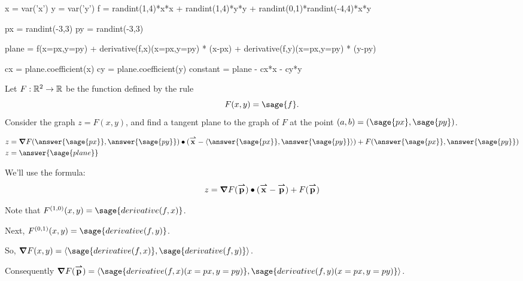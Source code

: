 \documentclass{ximera}
\author{Jim Fowler \and Bart Snapp}
\begin{document}
\makerandom

\begin{sagesilent}
x = var('x')
y = var('y')
f = randint(1,4)*x*x + randint(1,4)*y*y + randint(0,1)*randint(-4,4)*x*y

px = randint(-3,3)
py = randint(-3,3)

plane = f(x=px,y=py) + derivative(f,x)(x=px,y=py) * (x-px) +   derivative(f,y)(x=px,y=py) * (y-py)

cx = plane.coefficient(x)
cy = plane.coefficient(y)
constant = plane - cx*x - cy*y
  
\end{sagesilent}

\begin{exercise}

  Let $F : \mathbb R^2 \to \mathbb R$ be the function defined by the rule
  \[
    F(x,y) = \sage{f}.
  \]
  Consider the graph $z = F(x,y)$, and find a tangent plane to the
  graph of $F$ at the point $(a,b) = (\sage{px},\sage{py})$.

  \begin{prompt}
    \begin{align*}
      z &= \grad F(\answer{\sage{px}},\answer{\sage{py}}) \dotp (\vec{x} - \vector{\answer{\sage{px}},\answer{\sage{py}}}) + F(\answer{\sage{px}},\answer{\sage{py}})\\
      z &= \answer{\sage{plane}}
    \end{align*}
  \end{prompt}

  \begin{hint}
    We'll use the formula:
    \[
    z =\boldsymbol\nabla F({\overset{\boldsymbol{\rightharpoonup}}{\mathbf{p}}}) \bullet ({\overset{\boldsymbol{\rightharpoonup}}{\mathbf{x}}}-{\overset{\boldsymbol{\rightharpoonup}}{\mathbf{p}}}) + F({\overset{\boldsymbol{\rightharpoonup}}{\mathbf{p}}})
    \]
  \end{hint}
  
  \begin{hint}
    Note that $F^{(1,0)}(x,y) = \sage{derivative(f,x)}$.
  \end{hint}


  \begin{hint}
    Next, $F^{(0,1)}(x,y) = \sage{derivative(f,y)}$.
  \end{hint}

  \begin{hint}
    So, $\grad F(x,y) = \vector{\sage{derivative(f,x)},\sage{derivative(f,y)}}$.
  \end{hint}
  
  
  \begin{hint}
    Consequently $\grad F(\vec{p}) = \vector{\sage{derivative(f,x)(x=px,y=py)},\sage{derivative(f,y)(x=px,y=py)}}$.
  \end{hint}  
  
\end{exercise}
\end{document}
